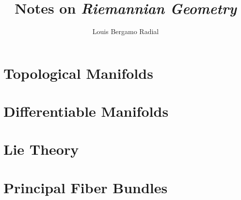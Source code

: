 \documentclass[12pt,oneside,a4paper]{book}
\title{Notes on \textit{Riemannian Geometry}}
\author{Louis Bergamo Radial}
\numberwithin{equation}{section}
\begin{document}
\maketitle

\tableofcontents

\chapter{Topological Manifolds}








\chapter{Differentiable Manifolds}






\chapter{Lie Theory}






\chapter{Principal Fiber Bundles}




\printbibliography
\end{document}
